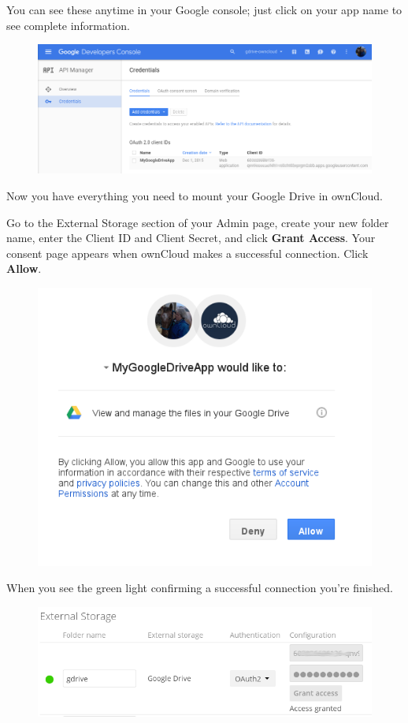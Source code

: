 \documentclass[letterpaper,10pt,english]{sphinxmanual}
\begin{document}
You can see these anytime in your Google console; just click on your app name
to see complete information.
\begin{figure}[htbp]
\centering

\includegraphics{google-drive11.png}
\end{figure}

Now you have everything you need to mount your Google Drive in ownCloud.

Go to the External Storage section of your Admin page, create your new folder
name, enter the Client ID and Client Secret, and click \textbf{Grant Access}. Your
consent page appears when ownCloud makes a successful connection. Click
\textbf{Allow}.
\begin{figure}[htbp]
\centering

\includegraphics{google-drive12.png}
\end{figure}

When you see the green light confirming a successful connection
you're finished.
\begin{figure}[htbp]
\centering

\includegraphics{google-drive13.png}
\end{figure}
\end{document}
